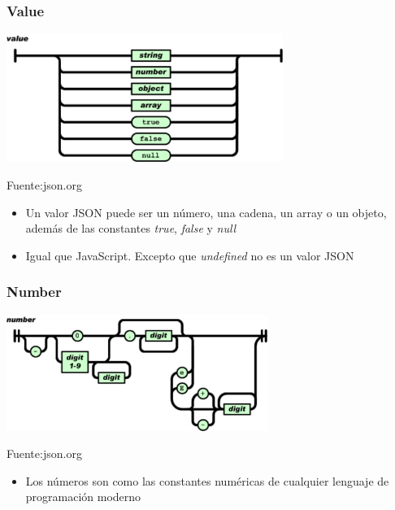 \documentclass[ucs]{beamer}
\begin{document}
\begin{frame}[fragile]
\frametitle{Value}
\begin{center}
  \includegraphics[width=09.0cm]{figs/value}
\end{center}
\begin{flushright}
\begin{tiny}
Fuente:json.org
\end{tiny}
\end{flushright}
\begin{itemize}
\item 
Un valor JSON puede ser un número, una cadena, un array o
un objeto, además de las constantes 
\emph{true},
\emph{false} y 
\emph{null}
\item 
Igual que JavaScript. Excepto que 
\emph{undefined} no es un valor JSON
\end{itemize}
\end{frame}




\begin{frame}[fragile]
\frametitle{Number}
\begin{center}
  \includegraphics[width=08.5cm]{figs/number}
\end{center}
\begin{flushright}
\begin{tiny}
Fuente:json.org
\end{tiny}
\end{flushright}
\begin{itemize}
\item 
Los números son como las constantes numéricas
de cualquier lenguaje de programación moderno
\end{itemize}
\end{frame}
\end{document}
